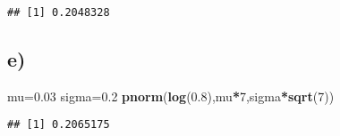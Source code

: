 \documentclass[
]{article}
\newenvironment{Shaded}{\begin{snugshade}}{\end{snugshade}}
\newcommand{\DecValTok}[1]{\textcolor[rgb]{0.00,0.00,0.81}{#1}}
\newcommand{\FloatTok}[1]{\textcolor[rgb]{0.00,0.00,0.81}{#1}}
\newcommand{\FunctionTok}[1]{\textcolor[rgb]{0.13,0.29,0.53}{\textbf{#1}}}
\newcommand{\NormalTok}[1]{#1}
\newcommand{\OtherTok}[1]{\textcolor[rgb]{0.56,0.35,0.01}{#1}}
\newcommand{\SpecialCharTok}[1]{\textcolor[rgb]{0.81,0.36,0.00}{\textbf{#1}}}
\begin{document}
\begin{verbatim}
## [1] 0.2048328
\end{verbatim}

\hypertarget{e-1}{%
\subsection{e)}\label{e-1}}

\begin{Shaded}
\begin{Highlighting}[]
\NormalTok{mu}\OtherTok{=}\FloatTok{0.03}
\NormalTok{sigma}\OtherTok{=}\FloatTok{0.2}
\FunctionTok{pnorm}\NormalTok{(}\FunctionTok{log}\NormalTok{(}\FloatTok{0.8}\NormalTok{),mu}\SpecialCharTok{*}\DecValTok{7}\NormalTok{,sigma}\SpecialCharTok{*}\FunctionTok{sqrt}\NormalTok{(}\DecValTok{7}\NormalTok{))}
\end{Highlighting}
\end{Shaded}

\begin{verbatim}
## [1] 0.2065175
\end{verbatim}
\end{document}
